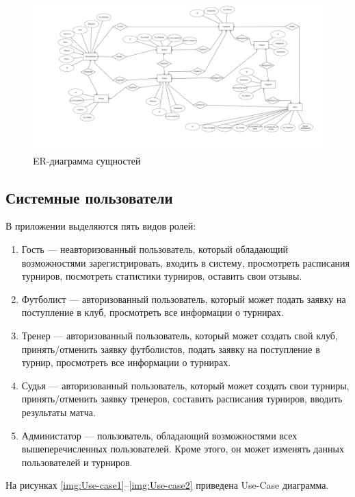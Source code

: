 \begin{figure}[h]
	\centering
	\includegraphics[height=0.3\textheight]{img/ER.png}
	\caption{ER-диаграмма сущностей}
	\label{img:ER}
\end{figure}
\subsection{Системные пользователи}

В приложении выделяются пять видов ролей:
\begin{enumerate}[left=36pt]
	\item Гость --- неавторизованный пользователь, который обладающий возможностями зарегистрировать, входить в систему, просмотреть расписания турниров, посмотреть  статистики турниров, оставить свои отзывы.
	\item Футболист --- авторизованный пользователь, который может подать заявку на поступление в клуб, просмотреть все информации о турнирах.
	\item Тренер --- авторизованный пользователь, который может создать свой клуб, принять/отменить заявку футболистов, подать заявку на поступление в турнир, просмотреть все информации о турнирах.
	\item Судья --- авторизованный пользователь, который может создать свои турниры, принять/отменить заявку тренеров, составить расписания турниров, вводить результаты матча.
	\item Администатор --- пользователь, обладающий возможностями всех вышеперечисленных пользователей. Кроме этого, он может изменять данных пользователей и турниров.
\end{enumerate}

На рисунках \ref{img:Use-case1}--\ref{img:Use-case2} приведена Use-Case диаграмма.

